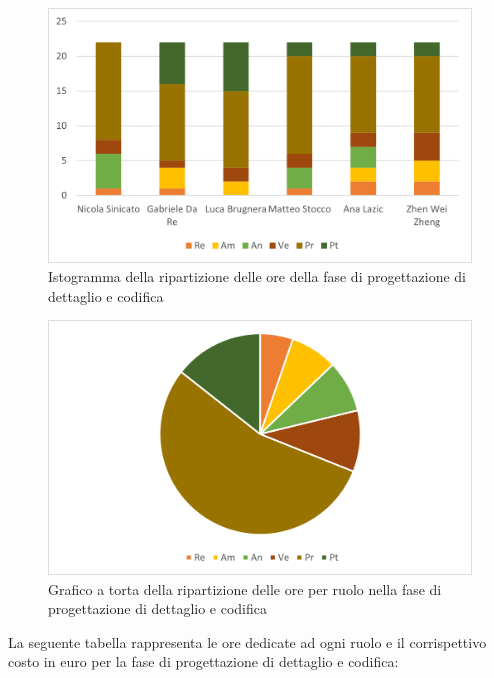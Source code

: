 \begin{figure}[H]
    \centering
    \includegraphics[scale=0.6]{img/grafi preventivo/istogrammi/codifica/complessivo.png}
    \caption{Istogramma della ripartizione delle ore della fase di progettazione di dettaglio e codifica}
\end{figure}
\begin{figure}[H]
    \centering
    \includegraphics[scale=0.6]{img/grafi preventivo/torta/codifica/complessivo.png}
    \caption{Grafico a torta della ripartizione delle ore per ruolo nella fase di progettazione di dettaglio e codifica}
\end{figure}
La seguente tabella rappresenta le ore dedicate ad ogni ruolo e il corrispettivo costo in euro per la fase di progettazione di dettaglio e codifica:


